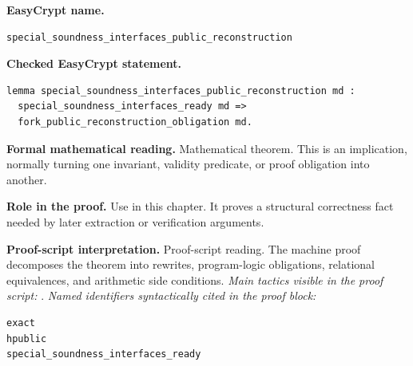\begin{formaltheorem}
\noindent\textbf{EasyCrypt name.}
\begin{lstlisting}[language=EasyCrypt,basicstyle=\ttfamily\scriptsize]
special_soundness_interfaces_public_reconstruction
\end{lstlisting}
\noindent\textbf{Checked EasyCrypt statement.}
\begin{lstlisting}[language=EasyCrypt,basicstyle=\ttfamily\scriptsize]
lemma special_soundness_interfaces_public_reconstruction md :
  special_soundness_interfaces_ready md =>
  fork_public_reconstruction_obligation md.
\end{lstlisting}
\noindent\textbf{Formal mathematical reading.}
Mathematical theorem. This is an implication, normally turning one invariant, validity predicate, or proof obligation into another.

\noindent\textbf{Role in the proof.}
Use in this chapter. It proves a structural correctness fact needed by later extraction or verification arguments.

\noindent\textbf{Proof-script interpretation.}
Proof-script reading. The machine proof decomposes the theorem into rewrites, program-logic obligations, relational equivalences, and arithmetic side conditions.
\emph{Main tactics visible in the proof script:} .
\emph{Named identifiers syntactically cited in the proof block:}
\begin{lstlisting}[language=EasyCrypt,basicstyle=\ttfamily\scriptsize]
exact
hpublic
special_soundness_interfaces_ready
\end{lstlisting}

\end{formaltheorem}


